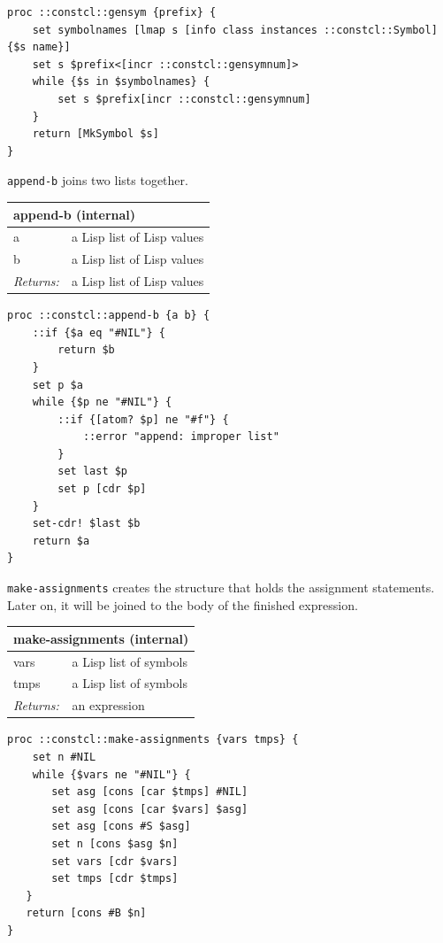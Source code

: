 \documentclass[twoside,9pt]{report}
\begin{document}
\noindent\makebox[\linewidth]{\rule{\linewidth}{0.4pt}}
\begin{lstlisting}
proc ::constcl::gensym {prefix} {
    set symbolnames [lmap s [info class instances ::constcl::Symbol] {$s name}]
    set s $prefix<[incr ::constcl::gensymnum]>
    while {$s in $symbolnames} {
        set s $prefix[incr ::constcl::gensymnum]
    }
    return [MkSymbol $s]
}
\end{lstlisting}
\noindent\makebox[\linewidth]{\rule{\linewidth}{0.4pt}}

\texttt{append-b} joins two lists together.

\begin{tabular}{ |l l| }
\hline
\multicolumn{2}{|l|}{append-b (internal)} \\
\hline
a & a Lisp list of Lisp values \\
b & a Lisp list of Lisp values \\
\textit{Returns:} & a Lisp list of Lisp values \\
\hline
\end{tabular}

\noindent\makebox[\linewidth]{\rule{\linewidth}{0.4pt}}
\begin{lstlisting}
proc ::constcl::append-b {a b} {
    ::if {$a eq "#NIL"} {
        return $b
    }
    set p $a
    while {$p ne "#NIL"} {
        ::if {[atom? $p] ne "#f"} {
            ::error "append: improper list"
        }
        set last $p
        set p [cdr $p]
    }
    set-cdr! $last $b
    return $a
}
\end{lstlisting}
\noindent\makebox[\linewidth]{\rule{\linewidth}{0.4pt}}

\texttt{make-assignments} creates the structure that holds the assignment statements. Later on, it will be joined to the body of the finished expression.

\begin{tabular}{ |l l| }
\hline
\multicolumn{2}{|l|}{make-assignments (internal)} \\
\hline
vars & a Lisp list of symbols \\
tmps & a Lisp list of symbols \\
\textit{Returns:} & an expression \\
\hline
\end{tabular}

\noindent\makebox[\linewidth]{\rule{\linewidth}{0.4pt}}
\begin{lstlisting}
proc ::constcl::make-assignments {vars tmps} {
    set n #NIL
    while {$vars ne "#NIL"} {
       set asg [cons [car $tmps] #NIL]
       set asg [cons [car $vars] $asg]
       set asg [cons #S $asg]
       set n [cons $asg $n]
       set vars [cdr $vars]
       set tmps [cdr $tmps]
   }
   return [cons #B $n]
}
\end{lstlisting}
\noindent\makebox[\linewidth]{\rule{\linewidth}{0.4pt}}
\end{document}
